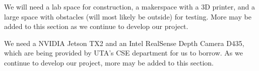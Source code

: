 We will need a lab space for construction, a makerspace with a 3D printer, and a large space with obstacles (will most likely be outside) for testing. More may be added to this section as we continue to develop our project.

We need a NVIDIA Jetson TX2 and an Intel RealSense Depth Camera D435, which are
being provided by UTA's CSE department for us to borrow. As we continue to develop our project, more may be added to this section.